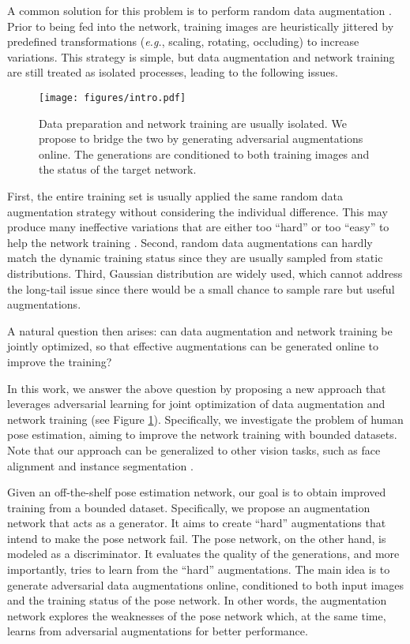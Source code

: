 \documentclass[10pt,twocolumn,letterpaper]{article}
\begin{document}
A common solution for this problem is to perform random data augmentation \cite{lecun1998gradient, toshev2014deeppose}. Prior to being fed into the network, training images are heuristically jittered by predefined transformations ({\it e.g.}, scaling, rotating, occluding) to increase variations. This strategy is simple, but data augmentation and network training are still treated as isolated processes, leading to the following issues.

\begin{figure}[t]
\centering
\texttt{[image: figures/intro.pdf]}
\caption{Data preparation and network training are usually isolated. We propose to bridge the two by generating adversarial augmentations online. The generations are conditioned to both training images and the status of the target network.}
\label{fig:intro}
\end{figure}

First, the entire training set is usually applied the same random data augmentation strategy without considering the individual difference. This may produce many ineffective variations that are either too ``hard'' or too ``easy'' to help the network training \cite{shrivastava2016training,wang2017fast}. Second, random data augmentations can hardly match the dynamic training status since they are usually sampled from static distributions. Third, Gaussian distribution are widely used, which cannot address the long-tail issue since there would be a small chance to sample rare but useful augmentations.

A natural question then arises: can data augmentation and network training be jointly optimized, so that effective augmentations can be generated online to improve the training?  %

In this work, we answer the above question by proposing a new approach that leverages adversarial learning for joint optimization of data augmentation and network training (see Figure \ref{fig:intro}). Specifically, we investigate the problem of human pose estimation, aiming to improve the network training with bounded datasets. Note that our approach can be generalized to other vision tasks, such as face alignment \cite{peng2016recurrent} and instance segmentation \cite{long2015fully, he2017maskrcnn}.

Given an off-the-shelf pose estimation network, our goal is to obtain improved training from a bounded dataset. Specifically, we propose an augmentation network that acts as a generator. It aims to create ``hard'' augmentations that intend to make the pose network fail. The pose network, on the other hand, is modeled as a discriminator. It evaluates the quality of the generations, and more importantly, tries to learn from the ``hard'' augmentations. The main idea is to generate adversarial data augmentations online, conditioned to both input images and the training status of the pose network. In other words, the augmentation network explores the weaknesses of the pose network which, at the same time, learns from adversarial augmentations for better performance.
\end{document}
